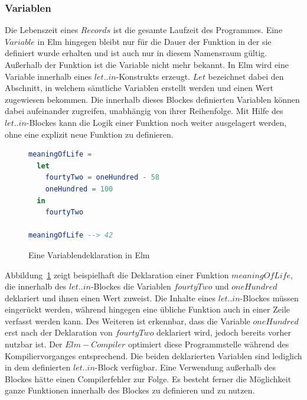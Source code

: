 \subsubsection{Variablen}
\label{sec:Variablen}
Die Lebenszeit eines $Records$ ist die gesamte Laufzeit des Programmes. Eine $Variable$ in Elm hingegen bleibt nur für die Dauer der Funktion in der sie definiert wurde erhalten und ist auch nur in diesem Namensraum gültig. Außerhalb der Funktion ist die Variable nicht mehr bekannt. In Elm wird eine Variable innerhalb eines $let..in$-Konstrukts erzeugt. $Let$ bezeichnet dabei den Abschnitt, in welchem sämtliche Variablen erstellt werden und einen Wert zugewiesen bekommen. Die innerhalb dieses Blockes definierten Variablen können dabei aufeinander zugreifen, unabhängig von ihrer Reihenfolge. Mit Hilfe des $let..in$-Blockes kann die Logik einer Funktion noch weiter ausgelagert werden, ohne eine explizit neue Funktion zu definieren.
\begin{figure}[h]
\begin{lstlisting}[language=Elm]
meaningOfLife =
  let
    fourtyTwo = oneHundred - 58
    oneHundred = 100
  in
    fourtyTwo

meaningOfLife --> 42
\end{lstlisting}
\caption{Eine Variablendeklaration in Elm}\label{fig:elm-variables}
\end{figure}
Abbildung~\ref{fig:elm-variables} zeigt beispielhaft die Deklaration einer Funktion $meaningOfLife$, die innerhalb des $let..in$-Blockes die Variablen $fourtyTwo$ und $oneHundred$ deklariert und ihnen einen Wert zuweist. Die Inhalte eines $let..in$-Blockes müssen eingerückt werden, während hingegen eine übliche Funktion auch in einer Zeile verfasst werden kann. Des Weiteren ist erkennbar, dass die Variable $oneHundred$ erst nach der Deklaration von $fourtyTwo$ deklariert wird, jedoch bereits vorher nutzbar ist. Der $Elm-Compiler$ optimiert diese Programmstelle während des Kompiliervorganges entsprechend. Die beiden deklarierten Variablen sind lediglich in dem definierten $let..in$-Block verfügbar. Eine Verwendung außerhalb des Blockes hätte einen Compilerfehler zur Folge. Es besteht ferner die Möglichkeit ganze Funktionen innerhalb des Blockes zu definieren und zu nutzen.

